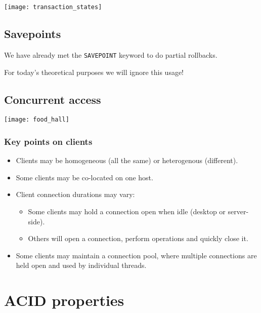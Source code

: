 \documentclass[slides]{pgnotes}
\begin{document}
\begin{center}
  \texttt{[image: transaction\_states]}
\end{center}

\subsection{Savepoints}

We have already met the \texttt{SAVEPOINT} keyword to do partial rollbacks.

For today's theoretical purposes we will ignore this usage!


\subsection{Concurrent access}

\begin{center}
  \texttt{[image: food\_hall]}
\end{center}


\subsubsection{Key points on clients}

\begin{itemize}
\item Clients may be homogeneous (all the same) or heterogenous (different).
\item Some clients may be co-located on one host.
\item Client connection durations may vary:
  \begin{itemize}
  \item Some clients may hold a connection open when idle (desktop or server-side).
  \item Others will open a connection, perform operations and quickly close it.
  \end{itemize}
\item Some clients may maintain a connection pool, where multiple connections are held open and used by individual threads.
\end{itemize}


\section{ACID properties}
\end{document}
